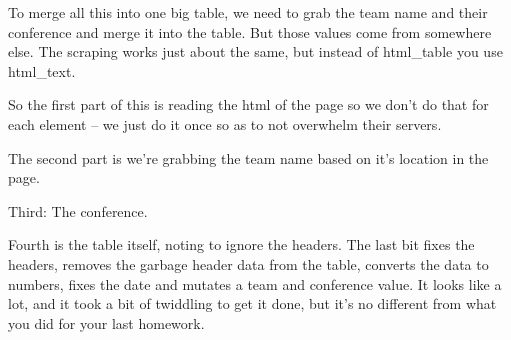 \documentclass[]{book}
\begin{document}
To merge all this into one big table, we need to grab the team name and
their conference and merge it into the table. But those values come from
somewhere else. The scraping works just about the same, but instead of
html\_table you use html\_text.

So the first part of this is reading the html of the page so we don't do
that for each element -- we just do it once so as to not overwhelm their
servers.

The second part is we're grabbing the team name based on it's location
in the page.

Third: The conference.

Fourth is the table itself, noting to ignore the headers. The last bit
fixes the headers, removes the garbage header data from the table,
converts the data to numbers, fixes the date and mutates a team and
conference value. It looks like a lot, and it took a bit of twiddling to
get it done, but it's no different from what you did for your last
homework.
\end{document}
